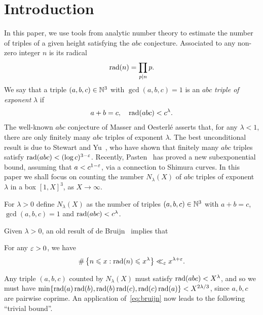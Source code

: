 %

\chapter{Introduction}

In this paper, we use tools from analytic number theory to estimate the number of triples of a given height satisfying the $abc$ conjecture.
Associated to any non-zero integer $n$ is its radical
\begin{align*}
\operatorname{rad}(n)=\prod_{p\mid n}p.
\end{align*}
We say that a triple $(a,b,c)\in \mathbb{N}^3$
with $\gcd(a,b,c)=1$ is
 an $abc$ \emph{triple of exponent} $\lambda$ if
\begin{align*}
a+b=c,\quad \operatorname{rad}(abc) < c^{\lambda}.
\end{align*}
The well-known $abc$ conjecture of Masser and Oesterl\'e asserts that, for any $\lambda<1$, there are only finitely many $abc$ triples of exponent $\lambda$.
The best unconditional result is due to Stewart and Yu~\cite{styu}, who have shown that finitely many $abc$ triples satisfy $\operatorname{rad}(abc) < (\log c)^{3-\varepsilon}$. Recently, Pasten~\cite{hector} has proved a new subexponential bound, assuming that $a<c^{1-\varepsilon}$, via a connection to Shimura curves.
In this paper we shall focus on counting the number $N_\lambda(X)$ of $abc$ triples of exponent $\lambda$ in a box $[1,X]^3$, as $X\to \infty$.

\begin{definition}\label{def:Nlambda}
For $\lambda>0$ define $N_\lambda(X)$ as the number of triples $(a,b,c)\in \mathbb{N}^3$ with $a+b=c$, $\gcd(a,b,c)=1$ and
$\operatorname{rad}(abc) < c^{\lambda}$.
\end{definition}

Given $\lambda>0$,
an old result of
de Bruijn~\cite{debruijn} implies that

\begin{lemma}\label{lem:deBruijnRadical}
For any $\varepsilon>0$, we have
\begin{equation}\label{eq:bruijn}
\#\left\{n\leqslant x : \operatorname{rad}(n)\leqslant x^\lambda\right\} \ll_\varepsilon x^{\lambda+\varepsilon}.
\end{equation}
\end{lemma}
Any triple $(a,b,c)$ counted by
$N_\lambda(X)$ must satisfy $\operatorname{rad}(abc)< X^{\lambda}$, and so
we must have
$\min\{\operatorname{rad}(a)\operatorname{rad}(b),\operatorname{rad}(b)\operatorname{rad}(c),\operatorname{rad}(c)\operatorname{rad}(a)\}< X^{2\lambda/3}$, since $a,b,c$ are pairwise coprime.
An application of~\eqref{eq:bruijn} now leads to the following ``trivial bound''.

